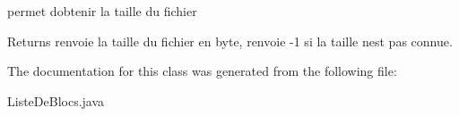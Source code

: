 permet d\textquotesingle{}obtenir la taille du fichier 

\begin{DoxyReturn}{Returns}
renvoie la taille du fichier en byte, renvoie -\/1 si la taille n\textquotesingle{}est pas connue. 
\end{DoxyReturn}


The documentation for this class was generated from the following file\+:\begin{DoxyCompactItemize}
\item 
Liste\+De\+Blocs.\+java\end{DoxyCompactItemize}
